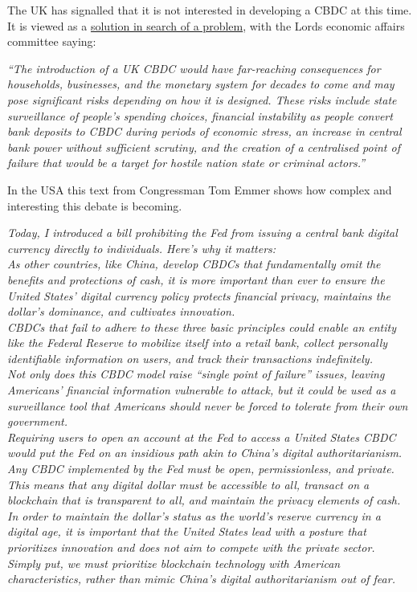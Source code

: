 The UK has signalled that it is not interested in developing a CBDC at this time. It is viewed as a \href{https://committees.parliament.uk/publications/8443/documents/85604/default/}{solution in search of a problem}, with the Lords economic affairs committee saying:\par
\textit{``The introduction of a UK CBDC would have far-reaching consequences for households, businesses, and the monetary system for decades to come and may pose significant risks depending on how it is designed. These risks include state surveillance of people’s spending choices, financial instability as people convert bank deposits to CBDC during periods of economic stress, an increase in central bank power without sufficient scrutiny, and the creation of a centralised point of failure that would be a target for hostile nation state or criminal actors.''}\par
In the USA this text from Congressman Tom Emmer shows how complex and interesting this debate is becoming.\par
\textit{Today, I introduced a bill prohibiting the Fed from issuing a central bank digital currency directly to individuals. Here’s why it matters:\\
As other countries, like China, develop CBDCs that fundamentally omit the benefits and protections of cash, it is more important than ever to ensure the United States’ digital currency policy protects financial privacy, maintains the dollar’s dominance, and cultivates innovation.\\
CBDCs that fail to adhere to these three basic principles could enable an entity like the Federal Reserve to mobilize itself into a retail bank, collect personally identifiable information on users, and track their transactions indefinitely.\\
Not only does this CBDC model raise ``single point of failure'' issues, leaving Americans’ financial information vulnerable to attack, but it could be used as a surveillance tool that Americans should never be forced to tolerate from their own government.\\
Requiring users to open an account at the Fed to access a United States CBDC would put the Fed on an insidious path akin to China’s digital authoritarianism.\\
Any CBDC implemented by the Fed must be open, permissionless, and private. This means that any digital dollar must be accessible to all, transact on a blockchain that is transparent to all, and maintain the privacy elements of cash.\\
In order to maintain the dollar’s status as the world’s reserve currency in a digital age, it is important that the United States lead with a posture that prioritizes innovation and does not aim to compete with the private sector.\\
Simply put, we must prioritize blockchain technology with American characteristics, rather than mimic China’s digital authoritarianism out of fear.}
